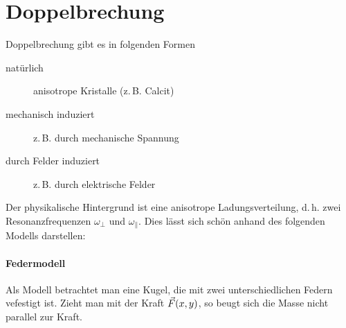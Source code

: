 
\section{Doppelbrechung} 
Doppelbrechung gibt es in folgenden Formen
\begin{description}
\item[natürlich] anisotrope Kristalle (z.\,B. Calcit)
\item[mechanisch induziert] z.\,B. durch mechanische Spannung
\item[durch Felder induziert] z.\,B. durch elektrische Felder
\end{description}
Der physikalische Hintergrund ist eine anisotrope Ladungsverteilung,
d.\,h. zwei Resonanzfrequenzen $\omega_\bot$ und $\omega_\parallel$.
Dies lässt sich schön anhand des folgenden Modells darstellen:

\paragraph{Federmodell}
Als Modell betrachtet man eine Kugel, die mit zwei unterschiedlichen
Federn vefestigt ist.
Zieht man mit der Kraft $\vec{F}(x,y)$, so beugt sich die Masse nicht
parallel zur Kraft.

